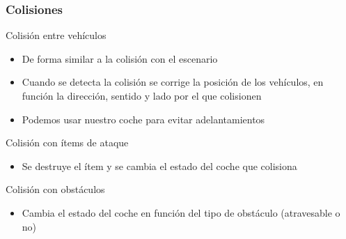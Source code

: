 \begin{frame}
    \frametitle{Colisiones}
    
    \begin{block}{Colisión entre vehículos}
        \begin{itemize}
            \item De forma similar a la colisión con el escenario
            \item Cuando se detecta la colisión se corrige la posición de los vehículos, en función la dirección, 
            sentido y lado por el que colisionen
            \item Podemos usar nuestro coche para evitar adelantamientos
        \end{itemize}
    \end{block}
    
    \begin{block}{Colisión con ítems de ataque}
      \begin{itemize}
            \item Se destruye el ítem y se cambia el estado del coche que colisiona
        \end{itemize}
    \end{block}
    
    \begin{block}{Colisión con obstáculos}
      \begin{itemize}
            \item Cambia el estado del coche en función del tipo de obstáculo (atravesable o no)
        \end{itemize}
    \end{block}

\end{frame}

